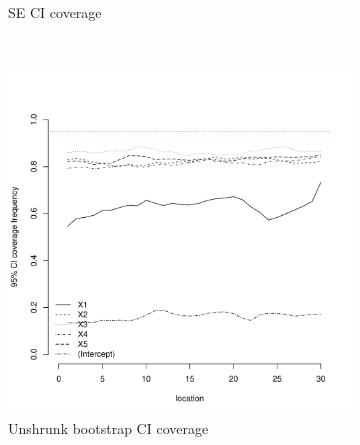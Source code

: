 \documentclass[authoryear, review, 11pt]{elsarticle}
\begin{document}
\begin{figure}
\begin{subfigure}[b]{0.45\textwidth}
		\caption{SE CI coverage}
	\end{subfigure}%
	\\%
	\begin{subfigure}[b]{0.45\textwidth}
	\centering
		\includegraphics[width=\textwidth]{../../figures/simulation/15.18.profile_unshrunk_bootstrap_coverage.pdf}
		\caption{Unshrunk bootstrap CI coverage}
	\end{subfigure}%
	~ %
	\begin{subfigure}[b]{0.45\textwidth}
	\centering

\end{subfigure}
\end{figure}
\end{document}
